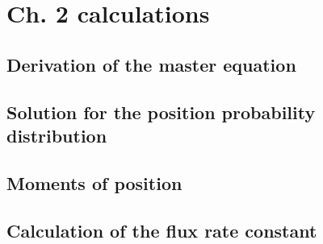 
\chapter{Ch. 2 calculations}


\section{Derivation of the master equation}
\section{Solution for the position probability distribution}
\section{Moments of position}
\section{Calculation of the flux rate constant}

